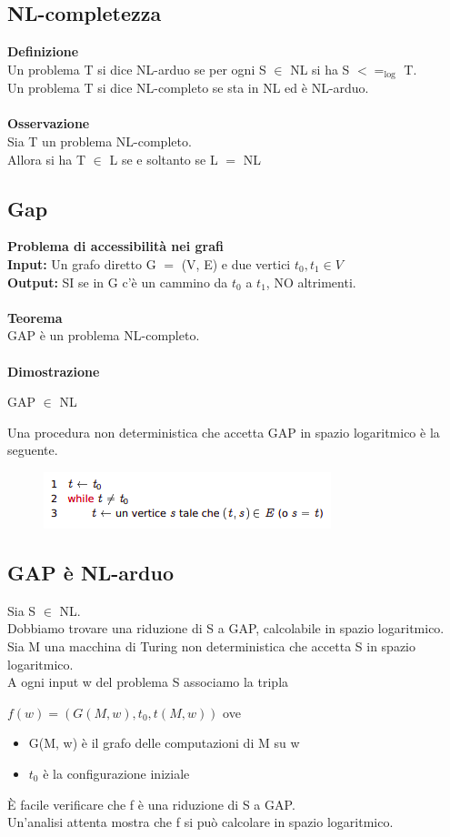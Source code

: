 \subsection{NL-completezza}
\textbf{Definizione}\\
Un problema T si dice NL-arduo se per ogni S $\in$ NL si ha S $<=_{\log}$ T.\\
Un problema T si dice NL-completo se sta in NL ed è NL-arduo.\\\\
\textbf{Osservazione}\\
Sia T un problema NL-completo.\\
Allora si ha T $\in$ L se e soltanto se L $=$ NL
\subsection{Gap}
\textbf{Problema di accessibilità nei grafi}\\
\textbf{Input:} Un grafo diretto G $=$ (V, E) e due vertici $t_0,t_1 \in V$\\
\textbf{Output:} SI se in G c’è un cammino da $t_0$ a $t_1$, NO altrimenti.\\\\
\textbf{Teorema}\\
GAP è un problema NL-completo.\\\\
\textbf{Dimostrazione}\\
\begin{center}
    GAP $\in$ NL
\end{center}
Una procedura non deterministica che accetta GAP in spazio logaritmico è
la seguente.
\begin{figure}[htp]
    \includegraphics[scale=0.9]{tesi_stile/img/foto1cap17.png}
\end{figure}
\newpage
\subsection{GAP è NL-arduo}
Sia S $\in$ NL.
\\Dobbiamo trovare una riduzione di S a GAP, calcolabile in spazio logaritmico.
\\Sia M una macchina di Turing non deterministica che accetta S in spazio
logaritmico.
\\A ogni input w del problema S associamo la tripla
\begin{center}
    $f (w) = (G(M, w),t_0,t(M, w))$ ove
\end{center}
\begin{itemize}
    \item G(M, w) è il grafo delle computazioni di M su w
    \item $t_0$ è la configurazione iniziale
\end{itemize}
È facile verificare che f è una riduzione di S a GAP.
\\Un’analisi attenta mostra che f si può calcolare in spazio logaritmico.


